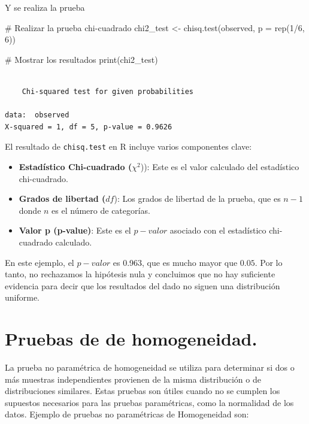 \documentclass[
  letterpaper,
  DIV=11,
  numbers=noendperiod]{scrreprt}
\newenvironment{Shaded}{\begin{snugshade}}{\end{snugshade}}
\newcommand{\AttributeTok}[1]{\textcolor[rgb]{0.40,0.45,0.13}{#1}}
\newcommand{\CommentTok}[1]{\textcolor[rgb]{0.37,0.37,0.37}{#1}}
\newcommand{\DecValTok}[1]{\textcolor[rgb]{0.68,0.00,0.00}{#1}}
\newcommand{\FunctionTok}[1]{\textcolor[rgb]{0.28,0.35,0.67}{#1}}
\newcommand{\NormalTok}[1]{\textcolor[rgb]{0.00,0.23,0.31}{#1}}
\newcommand{\OtherTok}[1]{\textcolor[rgb]{0.00,0.23,0.31}{#1}}
\newcommand{\SpecialCharTok}[1]{\textcolor[rgb]{0.37,0.37,0.37}{#1}}
\providecommand{\tightlist}{%
  \setlength{\itemsep}{0pt}\setlength{\parskip}{0pt}}\usepackage{longtable,booktabs,array}
\begin{document}
\begin{tcolorbox}
Y se realiza la prueba

\begin{Shaded}
\begin{Highlighting}[]
\CommentTok{\# Realizar la prueba chi{-}cuadrado}
\NormalTok{chi2\_test }\OtherTok{\textless{}{-}} \FunctionTok{chisq.test}\NormalTok{(observed, }\AttributeTok{p =} \FunctionTok{rep}\NormalTok{(}\DecValTok{1}\SpecialCharTok{/}\DecValTok{6}\NormalTok{, }\DecValTok{6}\NormalTok{))}

\CommentTok{\# Mostrar los resultados}
\FunctionTok{print}\NormalTok{(chi2\_test)}
\end{Highlighting}
\end{Shaded}

\begin{verbatim}

    Chi-squared test for given probabilities

data:  observed
X-squared = 1, df = 5, p-value = 0.9626
\end{verbatim}

El resultado de \texttt{chisq.test} en R incluye varios componentes
clave:

\begin{itemize}
\tightlist
\item
  \textbf{Estadístico Chi-cuadrado (}\(\chi^2\))): Este es el valor
  calculado del estadístico chi-cuadrado.
\item
  \textbf{Grados de libertad (}\(df\)): Los grados de libertad de la
  prueba, que es \(n - 1\) donde \(n\) es el número de categorías.
\item
  \textbf{Valor p (p-value)}: Este es el \(p-valor\) asociado con el
  estadístico chi-cuadrado calculado.
\end{itemize}

En este ejemplo, el \(p-valor\) es 0.963, que es mucho mayor que
\(0.05\). Por lo tanto, no rechazamos la hipótesis nula y concluimos que
no hay suficiente evidencia para decir que los resultados del dado no
siguen una distribución uniforme.

\end{tcolorbox}

\hypertarget{pruebas-de-de-homogeneidad.}{%
\section{Pruebas de de
homogeneidad.}\label{pruebas-de-de-homogeneidad.}}

La prueba no paramétrica de homogeneidad se utiliza para determinar si
dos o más muestras independientes provienen de la misma distribución o
de distribuciones similares. Estas pruebas son útiles cuando no se
cumplen los supuestos necesarios para las pruebas paramétricas, como la
normalidad de los datos. Ejemplo de pruebas no paramétricas de
Homogeneidad son:
\end{document}
